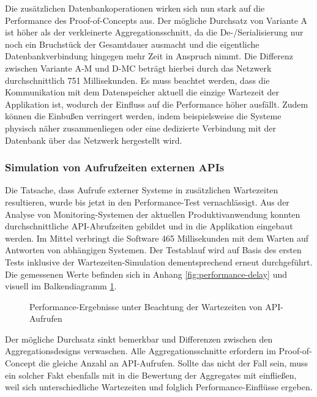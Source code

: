 Die zusätzlichen Datenbankoperationen wirken sich nun stark auf die Performance des Proof-of-Concepts aus. Der mögliche Durchsatz von Variante A ist höher als der verkleinerte Aggregationsschnitt, da die De-/Serialisierung nur noch ein Bruchstück der Gesamtdauer ausmacht und die eigentliche Datenbankverbindung hingegen mehr Zeit in Anspruch nimmt. Die Differenz zwischen Variante A-M und D-MC beträgt hierbei durch das Netzwerk durchschnittlich 751 Millisekunden. Es muss beachtet werden, dass die Kommunikation mit dem Datenspeicher aktuell die einzige Wartezeit der Applikation ist, wodurch der Einfluss auf die Performance höher ausfällt. Zudem können die Einbußen verringert werden, indem beispielsweise die Systeme physisch näher zusammenliegen oder eine dedizierte Verbindung mit der Datenbank über das Netzwerk hergestellt wird.

\subsubsection{Simulation von Aufrufzeiten externen APIs}

Die Tatsache, dass Aufrufe externer Systeme in zusätzlichen Wartezeiten resultieren, wurde bis jetzt in den Performance-Test vernachlässigt. Aus der Analyse von Monitoring-Systemen der aktuellen Produktivanwendung konnten durchschnittliche API-Abrufzeiten gebildet und in die Applikation eingebaut werden. Im Mittel verbringt die Software 465 Millisekunden mit dem Warten auf Antworten von abhängigen Systemen. Der Testablauf wird auf Basis des ersten Tests inklusive der Wartezeiten-Simulation dementsprechend erneut durchgeführt. Die gemessenen Werte befinden sich in Anhang \ref{fig:performance-delay} und visuell im Balkendiagramm \ref{fig:PerformanceDelay}. 

\begin{figure}[htpb]
	\centering
	\footnotesize
	
	\caption{Performance-Ergebnisse unter Beachtung der Wartezeiten von API-Aufrufen}
	\label{fig:PerformanceDelay}
\end{figure}

Der mögliche Durchsatz sinkt bemerkbar und Differenzen zwischen den Aggregationsdesigns verwaschen. Alle Aggregationsschnitte erfordern im Proof-of-Concept die gleiche Anzahl an API-Aufrufen. Sollte das nicht der Fall sein, muss ein solcher Fakt ebenfalls mit in die Bewertung der Aggregates mit einfließen, weil sich unterschiedliche Wartezeiten und folglich Performance-Einflüsse ergeben. 

